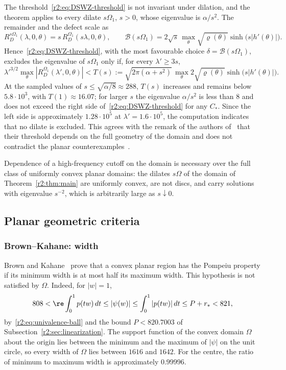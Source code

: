 \begin{remark}
The threshold~\eqref{r2:eq:DSWZ-threshold} is not invariant under dilation, and the theorem applies to every dilate $s\Omega_1$, $s>0$, whose eigenvalue is $\alpha/s^2$. The remainder and the defect scale as
\[
 R_D^{s\Omega_1}(\lambda,0,\theta)=s\,R_D^{\Omega_1}(s\lambda,0,\theta),
 \qquad
 \mathcal B(s\Omega_1)=2\sqrt s\,\max_\theta\sqrt{\varrho(\theta)}\sinh\bigl(s|h'(\theta)|\bigr).
\]
Hence~\eqref{r2:eq:DSWZ-threshold}, with the most favourable choice $\delta=\mathcal B(s\Omega_1)$, excludes the eigenvalue of $s\Omega_1$ only if, for every $\lambda'\ge3s$,
\[
 \lambda'^{3/2}\max_\theta|R_D^{\Omega_1}(\lambda',0,\theta)|<T(s)
 :=\sqrt{2\pi(\alpha+s^2)}\,\max_\theta2\sqrt{\varrho(\theta)}\sinh\bigl(s|h'(\theta)|\bigr).
\]
At the sampled values of $s\le\sqrt{\alpha/8}\approx288$, $T(s)$ increases and remains below $5.8\cdot10^3$, with $T(1)\approx16.07$; for larger $s$ the eigenvalue $\alpha/s^2$ is less than $8$ and does not exceed the right side of~\eqref{r2:eq:DSWZ-threshold} for any $C_*$. Since the left side is approximately $1.28\cdot10^5$ at $\lambda'=1.6\cdot10^5$, the computation indicates that no dilate is excluded. This agrees with the remark of the authors of~\cite{DSWZ25} that their threshold depends on the full geometry of the domain and does not contradict the planar counterexamples~\cite{CS26,CLdDP26}.

Dependence of a high-frequency cutoff on the domain is necessary over the full class of uniformly convex planar domains: the dilates $s\Omega$ of the domain of Theorem~\ref{r2:thm:main} are uniformly convex, are not discs, and carry solutions with eigenvalue $s^{-2}$, which is arbitrarily large as $s\downarrow0$.
\end{remark}

\subsection{Planar geometric criteria}
\subsubsection{Brown--Kahane: width}
Brown and Kahane~\cite{BK82} prove that a convex planar region has the Pompeiu property if its minimum width is at most half its maximum width. This hypothesis is not satisfied by $\Omega$. Indeed, for $|w|=1$,
\[
 808<\re\int_0^1p(tw)\,dt\le|\psi(w)|\le\int_0^1|p(tw)|\,dt\le P+r_*<821,
\]
by~\eqref{r2:eq:univalence-ball} and the bound $P<820.7003$ of Subsection~\ref{r2:sec:linearization}. The support function of the convex domain $\Omega$ about the origin lies between the minimum and the maximum of $|\psi|$ on the unit circle, so every width of $\Omega$ lies between $1616$ and $1642$. For the centre, the ratio of minimum to maximum width is approximately $0.99996$.


